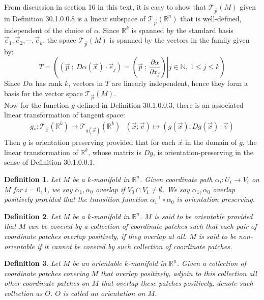 \documentclass[15pt]{book}
\theoremstyle{break}
\theoremstyle{break}
\newtheorem{defn}{Definition}[corL]
\newcommand{\R}{\mathbb{R}}
\newcommand{\N}{\mathbb{N}}
\newcommand{\T}{\mathcal{T}}
\begin{document}
From discussion in section 16 in this text, it is easy to show that $\T_{\vec{p}}(M)$ given in Definition 30.1.0.0.8 is a linear subspace of $\T_{\vec{p}}(\R^n)$ that is well-defined, independent of the choice of $\alpha$. Since $\R^k$ is spanned by the standard basis $\vec{e}_1,\vec{e}_2,\cdots, \vec{e}_k$, the space $\T_{\vec{p}}(M)$ is spanned by the vectors in the family given by:
$$T = \left((\vec{p}\ ;\ D\alpha(\vec{x})\cdot \vec{e}_j ) = \left.\left(\vec{p}\ ;\ \frac{\partial \alpha}{\partial x_j }\right) \right| j \in \N , \ 1\leq j \leq k\right) $$
Since $D\alpha$ has rank $k$, vectors in $T$ are linearly independent, hence they form a basis for the vector space $\T_{\vec{p}}(M)$. \\

Now for the function $g $ defined in Definition 30.1.0.0.3, there is an associated linear transformation of tangent space:
\begin{align*}
g_*: \T_{\vec{x}}(\R^k) \to \T_{g(\vec{x})}(\R^k) \ \ \ (\vec{x};\vec{v}) \mapsto (g(\vec{x}) ; Dg(\vec{x}) \cdot \vec{v})
\end{align*}
Then $g$ is orientation preserving provided that for each $\vec{x}$ in the domain of $g$, the linear transformation of $\R^k$, whose matrix is $Dg$, is orientation-preserving in the sense of Definition 30.1.0.0.1.\\

\begin{defn}
Let $M$ be a $k$-manifold in $\R^n$. Given coordinate path $\alpha_i:U_i \to V_i$ on $M$ for $i = 0,1$, we say $\alpha_1,\alpha_0$ overlap if $V_0 \cap V_1 \neq \emptyset$. We say $\alpha_1,\alpha_0$ overlap positively provided that the transition function $\alpha_1^{-1} \circ \alpha_0$ is orientation preserving.
\end{defn}

\begin{defn}
Let $M$ be a $k$-manifold in $\R^n$. $M$ is said to be orientable provided that $M$ can be covered by a collection of coordinate patches such that each pair of coordinate patches overlap positively, if they overlap at all. $M$ is said to be non-orientable if it cannot be covered by such collection of coordinate patches. 
\end{defn}

\begin{defn}
Let $M$ be an orientable $k$-manifold in $\R^n$. Given a collection of coordinate patches covering $M$ that overlap positively, adjoin to this collection all other coordinate patches on $M$ that overlap these patches positively, denote such collection as $O$. $O$ is called an orientation on $M$. 
\end{defn}
\end{document}
